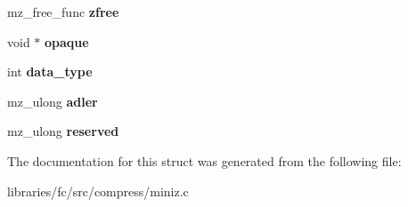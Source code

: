 \begin{DoxyCompactItemize}
\item 
\mbox{\label{structmz__stream__s_a55dbac0e9b86472bfa41f86dfb35df9a}} 
mz\+\_\+free\+\_\+func {\bfseries zfree}
\item 
\mbox{\label{structmz__stream__s_a31c21928246598992a5cce6d20ae7e78}} 
void $\ast$ {\bfseries opaque}
\item 
\mbox{\label{structmz__stream__s_a3e1503f72464a3b7b40d1df232ba9f43}} 
int {\bfseries data\+\_\+type}
\item 
\mbox{\label{structmz__stream__s_a24c6cf42b5b6a655f4664dd15203dce7}} 
mz\+\_\+ulong {\bfseries adler}
\item 
\mbox{\label{structmz__stream__s_ae4fc708fffee7b10a4586964401613fb}} 
mz\+\_\+ulong {\bfseries reserved}
\end{DoxyCompactItemize}


The documentation for this struct was generated from the following file\+:\begin{DoxyCompactItemize}
\item 
libraries/fc/src/compress/miniz.\+c\end{DoxyCompactItemize}
